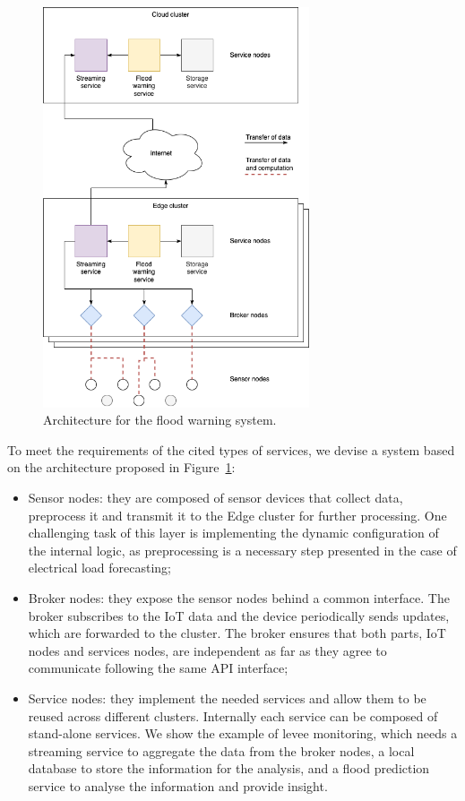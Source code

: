 \begin{figure}[ht]
\centering
\includegraphics[width=0.7\textwidth]{figures/architecture-levee2}
\caption{Architecture for the flood warning system.}
\label{fig:architecture-levee}
\end{figure}

To meet the requirements of the cited types of services, we devise a system based on the architecture proposed in Figure~\ref{fig:architecture-levee}:

\begin{itemize}
    \item Sensor nodes: they are composed of sensor devices that collect data, preprocess it and transmit it to the Edge cluster for further processing. One challenging task of this layer is implementing the dynamic configuration of the internal logic, as preprocessing is a necessary step presented in the case of electrical load forecasting;
    \item Broker nodes: they expose the sensor nodes behind a common interface. The broker subscribes to the IoT data and the device periodically sends updates, which are forwarded to the cluster. The broker ensures that both parts, IoT nodes and services nodes, are independent as far as they agree to communicate following the same API interface;
    \item Service nodes: they implement the needed services and allow them to be reused across different clusters. Internally each service can be composed of stand-alone services. We show the example of levee monitoring, which needs a streaming service to aggregate the data from the broker nodes, a local database to store the information for the analysis, and a flood prediction service to analyse the information and provide insight. 
\end{itemize}

